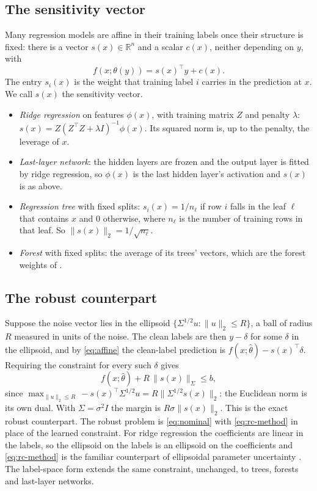 \subsection{The sensitivity vector}
Many regression models are affine in their training labels once their
structure is fixed: there is a vector $s(x) \in \mathbb{R}^n$ and a scalar
$c(x)$, neither depending on $y$, with
\begin{equation}\label{eq:affine}
  f(x;\theta(y)) = s(x)^\top y + c(x) .
\end{equation}
The entry $s_i(x)$ is the weight that training label $i$ carries in the
prediction at $x$. We call $s(x)$ the sensitivity vector.

\begin{itemize}
  \item \emph{Ridge regression} on features $\phi(x)$, with training matrix
    $Z$ and penalty $\lambda$: $s(x) = Z(Z^\top Z + \lambda I)^{-1}\phi(x)$.
    Its squared norm is, up to the penalty, the leverage of $x$.
  \item \emph{Last-layer network}: the hidden layers are frozen and the output
    layer is fitted by ridge regression, so $\phi(x)$ is the last hidden
    layer's activation and $s(x)$ is as above.
  \item \emph{Regression tree} with fixed splits: $s_i(x) = 1/n_\ell$ if row
    $i$ falls in the leaf $\ell$ that contains $x$ and $0$ otherwise, where
    $n_\ell$ is the number of training rows in that leaf. So
    $\|s(x)\|_2 = 1/\sqrt{n_\ell}$.
  \item \emph{Forest} with fixed splits: the average of its trees' vectors,
    which are the forest weights of \citet{meinshausen2006quantile}.
\end{itemize}

\subsection{The robust counterpart}
Suppose the noise vector lies in the ellipsoid
$\{\Sigma^{1/2}u : \|u\|_2 \le R\}$, a ball of radius $R$ measured in units of
the noise. The clean labels are then $y - \delta$ for some $\delta$ in the
ellipsoid, and by \eqref{eq:affine} the clean-label prediction is
$f(x;\hat\theta) - s(x)^\top\delta$. Requiring the constraint for every such
$\delta$ gives
\begin{equation}\label{eq:rc-method}
  f(x;\hat\theta) + R\,\|s(x)\|_\Sigma \le b ,
\end{equation}
since $\max_{\|u\|_2 \le R} \, -s(x)^\top\Sigma^{1/2}u = R\|\Sigma^{1/2}s(x)\|_2$:
the Euclidean norm is its own dual. With $\Sigma = \sigma^2 I$ the margin is
$R\sigma\|s(x)\|_2$. This is the exact robust counterpart. The robust problem
is \eqref{eq:nominal} with \eqref{eq:rc-method} in place of the learned
constraint. For ridge regression the coefficients are linear in the labels,
so the ellipsoid on the labels is an ellipsoid on the coefficients and
\eqref{eq:rc-method} is the familiar counterpart of ellipsoidal parameter
uncertainty \citep{goldfarb2003robust, bertsimas2022robust}. The label-space
form extends the same constraint, unchanged, to trees, forests and last-layer
networks.

